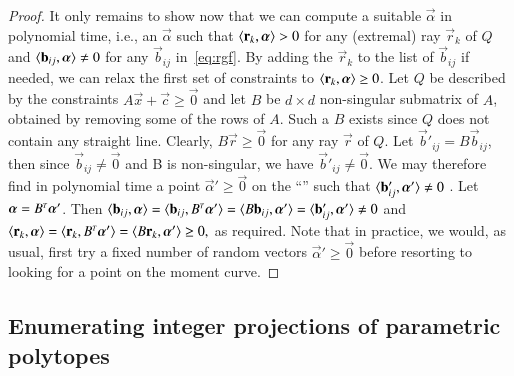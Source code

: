 \begin{proof}
It only remains to show now that we can compute a suitable $\vec \alpha$
in polynomial time, i.e., an $\vec \alpha$ such that
$\sps {\vec r_k} {\vec \alpha} > 0$ for any (extremal) ray $\vec r_k$ of $Q$ and
$\sps {\vec b_{i j}} {\vec \alpha} \ne 0$ for any
$\vec b_{i j}$ in~\eqref{eq:rgf}.
By adding the $\vec r_k$ to the list of $\vec b_{i j}$ if needed, we can relax
the first set of constraints to $\sps {\vec r_k} {\vec \alpha} \ge 0$.
Let $Q$ be described by the constraints $A \vec x + \vec c \ge \vec 0$
and let $B$ be $d \times d$ non-singular submatrix of $A$, obtained
by removing some of the rows of $A$.  Such a $B$ exists since
$Q$ does not contain any straight line.
Clearly, $B \vec r \ge \vec 0$ for any ray $\vec r$ of $Q$.
Let $\vec b'_{i j} = B \vec b_{i j}$, then since $\vec b_{i j} \ne \vec 0$
and B is non-singular, we have $\vec b'_{i j} \ne \vec 0$.
We may therefore find in polynomial time a point $\vec \alpha' \ge \vec 0$
on the ``'' such that
$\sps {\vec b'_{i j}} {\vec \alpha'} \ne 0$
.
Let $\vec \alpha = B^\T \vec \alpha'$.
Then
$
\sps {\vec b_{i j}} {\vec \alpha}
=
\sps {\vec b_{i j}} {B^\T \vec \alpha'}
=
\sps {B \vec b_{i j}} {\vec \alpha'}
=
\sps {\vec b'_{i j}} {\vec \alpha'}
\ne 0
$
and
$
\sps {\vec r_k} {\vec \alpha}
=
\sps {\vec r_k} {B^\T \vec \alpha'}
=
\sps {B \vec r_k} {\vec \alpha'}
\ge 0
,
$
as required.
Note that in practice, we would, as usual, first try a
fixed number of random vectors $\vec \alpha' \ge \vec 0$
before resorting to looking for a point on the moment curve.
\end{proof}


\subsection{Enumerating integer projections of parametric polytopes}
\label{s:projection}


